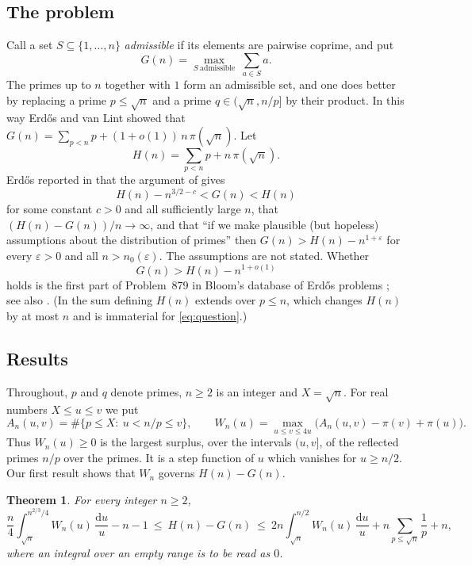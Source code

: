 \documentclass[11pt,reqno]{amsart}
\newtheorem{theorem}{Theorem}[section]
\theoremstyle{definition}
\theoremstyle{remark}
\numberwithin{equation}{section}
\newcommand{\dd}{\mathrm{d}}
\newcommand{\eps}{\varepsilon}
\begin{document}
\subsection{The problem}
Call a set $S\subseteq\{1,\dots,n\}$ \emph{admissible} if its elements are pairwise coprime, and put
\[
 G(n)=\max_{S\ \mathrm{admissible}}\ \sum_{a\in S}a .
\]
The primes up to $n$ together with $1$ form an admissible set, and one does better by replacing a prime $p\le\sqrt n$ and a prime $q\in(\sqrt n,n/p]$ by their product. In this way Erd\H{o}s and van Lint \cite{EvL} showed that $G(n)=\sum_{p<n}p+(1+o(1))\,n\,\pi(\sqrt n)$. Let
\[
 H(n)=\sum_{p<n}p+n\,\pi(\sqrt n).
\]
Erd\H{o}s reported in \cite[p.~120]{Er84} that the argument of \cite{EvL} gives
\begin{equation}\label{eq:evl}
 H(n)-n^{3/2-c}<G(n)<H(n)
\end{equation}
for some constant $c>0$ and all sufficiently large $n$, that $(H(n)-G(n))/n\to\infty$, and that ``if we make plausible (but hopeless) assumptions about the distribution of primes'' then $G(n)>H(n)-n^{1+\eps}$ for every $\eps>0$ and all $n>n_0(\eps)$. The assumptions are not stated. Whether
\begin{equation}\label{eq:question}
 G(n)>H(n)-n^{1+o(1)}
\end{equation}
holds is the first part of Problem~879 in Bloom's database of Erd\H{o}s problems \cite{Bl}; see also \cite{Er98}. (In \cite{Er84} the sum defining $H(n)$ extends over $p\le n$, which changes $H(n)$ by at most $n$ and is immaterial for \eqref{eq:question}.)

\subsection{Results}
Throughout, $p$ and $q$ denote primes, $n\ge2$ is an integer and $X=\sqrt n$. For real numbers $X\le u\le v$ we put
\begin{equation}\label{eq:W}
 A_n(u,v)=\#\{p\le X:\ u<n/p\le v\},\qquad
 W_n(u)=\max_{u\le v\le 4u}\bigl(A_n(u,v)-\pi(v)+\pi(u)\bigr).
\end{equation}
Thus $W_n(u)\ge0$ is the largest surplus, over the intervals $(u,v]$, of the reflected primes $n/p$ over the primes. It is a step function of $u$ which vanishes for $u\ge n/2$. Our first result shows that $W_n$ governs $H(n)-G(n)$.

\begin{theorem}\label{thm:twosided}
For every integer $n\ge2$,
\[
 \frac n4\int_{\sqrt n}^{n^{2/3}/4}W_n(u)\,\frac{\dd u}{u}-n-1
 \ \le\ H(n)-G(n)\ \le\
 2n\int_{\sqrt n}^{n/2}W_n(u)\,\frac{\dd u}{u}+n\sum_{p\le\sqrt n}\frac1p+n,
\]
where an integral over an empty range is to be read as $0$.
\end{theorem}
\end{document}
